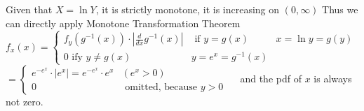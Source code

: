Given that $X=\ln Y$, it is strictly monotone, it is increasing on $(0, \infty)$ Thus we can directly apply Monotone Transformation Theorem
$f_{x}(x)=\left\{\begin{array}{lll}f_{y}\left(g^{-1}(x)\right) \cdot\left|\frac{d}{d x} g^{-1}(x)\right| & \text { if } y=g(x) & x=\ln y=g(y) \\ 0 \text { ify } y \neq g(x) & y=e^{x}=g^{-1}(x)\end{array}\right.$
$=\left\{\begin{array}{ll}e^{-e^{x}} \cdot\left|e^{x}\right|=e^{-e^{x}} \cdot e^{x} & \left(e^{x}>0\right) \\ 0 & \text { omitted, because } y>0\end{array} \quad\right.$ and the pdf of $x$ is always not zero.